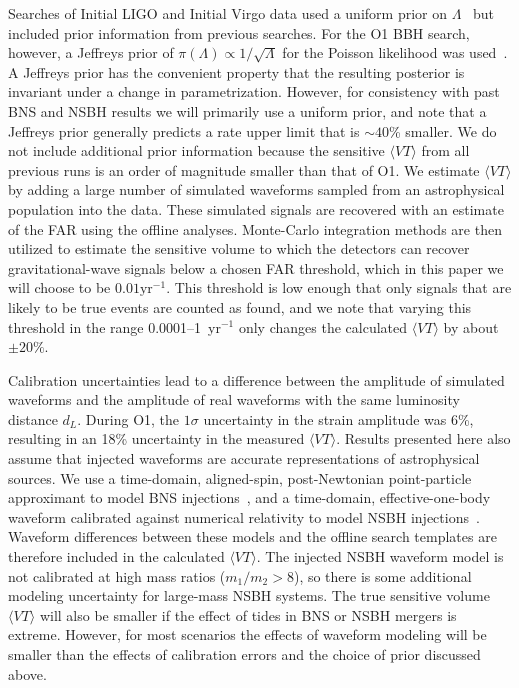 Searches of Initial \ac{LIGO} and Initial Virgo data used a uniform prior on
$\Lambda$~\citep{Colaboration:2011np} but included prior information from previous searches. 
For the \ac{O1} \ac{BBH} search, however, a Jeffreys prior of
$\pi (\Lambda) \propto 1/\sqrt{\Lambda}$ for the Poisson likelihood was used~\citep{Farr:2013yna,Abbott:2016nhf,TheLIGOScientific:2016pea}.
A Jeffreys prior has the convenient property that the resulting posterior is invariant under a change in parametrization. 
However, for consistency with past BNS and NSBH results we will primarily use a uniform prior, and note that a Jeffreys
prior generally predicts a rate upper limit that is $\sim 40$\% smaller. 
We do not include additional prior information because the sensitive $\langle VT \rangle$ from 
all previous runs is an order of magnitude smaller than that of \ac{O1}.
We estimate $\langle VT \rangle$ by adding a large number of
simulated waveforms sampled from an astrophysical population into the data. 
These simulated signals
are recovered with an estimate of the FAR using the offline analyses.
Monte-Carlo integration methods are then utilized to estimate
the sensitive volume to which the detectors can recover gravitational-wave signals
below a chosen FAR threshold, which in this paper we will choose to be $0.01 \mathrm{yr}^{-1}$.
This threshold is low enough that only signals that are likely to be true events are counted as found, and we 
note that varying this threshold in the range 0.0001--1~yr$^{-1}$ only changes the calculated $\langle VT \rangle$ 
by about $\pm 20\%$.

Calibration uncertainties lead to a difference between the amplitude of simulated
waveforms and the amplitude of real waveforms with the same luminosity distance $d_L$.
During \ac{O1}, the $1\sigma$ uncertainty in the strain amplitude was 6\%, resulting
in an 18\% uncertainty in the measured $\langle VT \rangle$. Results presented here
also assume that injected waveforms are accurate
representations of astrophysical sources. We use a time-domain, aligned-spin,
post-Newtonian point-particle approximant to model \ac{BNS}
injections~\citep{Buonanno:2009zt}, and a time-domain, effective-one-body waveform
calibrated against numerical relativity to model \ac{NSBH}
injections~\citep{Pan:2013rra,Taracchini:2013rva}. Waveform differences between these models and
the offline search templates are therefore included in the calculated $\langle VT \rangle$. 
The injected NSBH waveform model is not calibrated at high mass ratios
($m_1/m_2 >8$), so there is some additional modeling uncertainty for large-mass NSBH
systems. The true sensitive volume $\langle VT \rangle$  will also be smaller if the effect of
tides in \ac{BNS} or \ac{NSBH} mergers is extreme. However, for most scenarios
the effects of waveform modeling will be smaller than the
effects of calibration errors and the choice of prior discussed above. 

